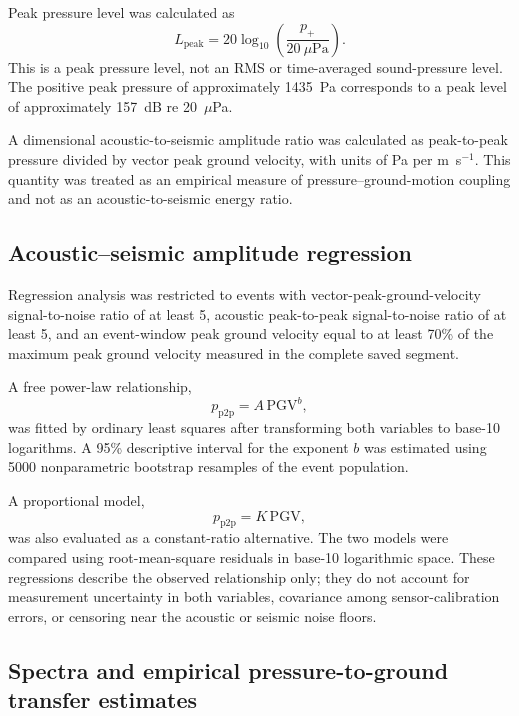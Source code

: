 \documentclass[]{seismica}
\begin{document}
Peak pressure level was calculated as
\begin{equation}
  L_{\mathrm{peak}} = 20\log_{10}\left(\frac{p_+}{20~\mu\mathrm{Pa}}\right).
  \label{eq:peak_pressure_level}
\end{equation}
This is a peak pressure level, not an RMS or time-averaged sound-pressure level. The positive peak pressure of approximately 1435~Pa corresponds to a peak level of approximately 157~dB re 20~$\mu$Pa.

A dimensional acoustic-to-seismic amplitude ratio was calculated as peak-to-peak pressure divided by vector peak ground velocity, with units of Pa per m~s$^{-1}$. This quantity was treated as an empirical measure of pressure--ground-motion coupling and not as an acoustic-to-seismic energy ratio.

\subsection{Acoustic--seismic amplitude regression}

Regression analysis was restricted to events with vector-peak-ground-velocity signal-to-noise ratio of at least 5, acoustic peak-to-peak signal-to-noise ratio of at least 5, and an event-window peak ground velocity equal to at least 70\% of the maximum peak ground velocity measured in the complete saved segment.

A free power-law relationship,
\begin{equation}
  p_{\mathrm{p2p}} = A\,\mathrm{PGV}^{b},
  \label{eq:power_law}
\end{equation}
was fitted by ordinary least squares after transforming both variables to base-10 logarithms. A 95\% descriptive interval for the exponent $b$ was estimated using 5000 nonparametric bootstrap resamples of the event population.

A proportional model,
\begin{equation}
  p_{\mathrm{p2p}} = K\,\mathrm{PGV},
  \label{eq:proportional_model}
\end{equation}
was also evaluated as a constant-ratio alternative. The two models were compared using root-mean-square residuals in base-10 logarithmic space. These regressions describe the observed relationship only; they do not account for measurement uncertainty in both variables, covariance among sensor-calibration errors, or censoring near the acoustic or seismic noise floors.

\subsection{Spectra and empirical pressure-to-ground transfer estimates}
\end{document}
